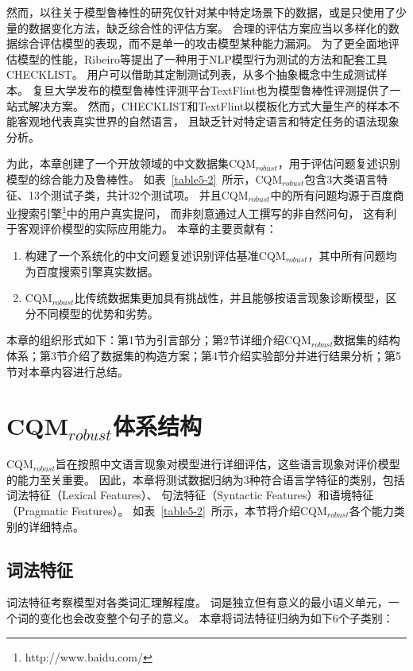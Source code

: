 然而，以往关于模型鲁棒性的研究仅针对某中特定场景下的数据，或是只使用了少量的数据变化方法，缺乏综合性的评估方案。
合理的评估方案应当以多样化的数据综合评估模型的表现，而不是单一的攻击模型某种能力漏洞。
为了更全面地评估模型的性能，Ribeiro等提出了一种用于NLP模型行为测试的方法和配套工具CHECKLIST\cite{ribeiro2020beyond}。
用户可以借助其定制测试列表，从多个抽象概念中生成测试样本。
复旦大学发布的模型鲁棒性评测平台TextFlint\cite{gui2021textflint}也为模型鲁棒性评测提供了一站式解决方案。
然而，CHECKLIST和TextFlint以模板化方式大量生产的样本不能客观地代表真实世界的自然语言，
且缺乏针对特定语言和特定任务的语法现象分析。

为此，本章创建了一个开放领域的中文数据集CQM$_{robust}$，用于评估问题复述识别模型的综合能力及鲁棒性。
如表~\ref{table5-2}~所示，CQM$_{robust}$包含3大类语言特征、13个测试子类，共计32个测试项。
并且CQM$_{robust}$中的所有问题均源于百度商业搜索引擎\footnote{http://www.baidu.com/}中的用户真实提问，
而非刻意通过人工撰写的非自然问句，
这有利于客观评价模型的实际应用能力。
本章的主要贡献有：

\begin{enumerate}
    \item 
    构建了一个系统化的中文问题复述识别评估基准CQM$_{robust}$，其中所有问题均为百度搜索引擎真实数据。
    \item 
    CQM$_{robust}$比传统数据集更加具有挑战性，并且能够按语言现象诊断模型，区分不同模型的优势和劣势。
\end{enumerate}

本章的组织形式如下：第1节为引言部分；第2节详细介绍CQM$_{robust}$数据集的结构体系；第3节介绍了数据集的构造方案；第4节介绍实验部分并进行结果分析；第5节对本章内容进行总结。


\section{CQM$_{robust}$体系结构}

CQM$_{robust}$旨在按照中文语言现象对模型进行详细评估，这些语言现象对评价模型的能力至关重要。
因此，本章将测试数据归纳为3种符合语言学特征的类别，包括词法特征（Lexical Features）、
句法特征（Syntactic Features）和语境特征（Pragmatic Features）。
如表~\ref{table5-2}~所示，本节将介绍CQM$_{robust}$各个能力类别的详细特点。

\subsection{词法特征}\label{5.2.1 词法特征}

词法特征考察模型对各类词汇理解程度。
词是独立但有意义的最小语义单元，一个词的变化也会改变整个句子的意义。
本章将词法特征归纳为如下6个子类别：

